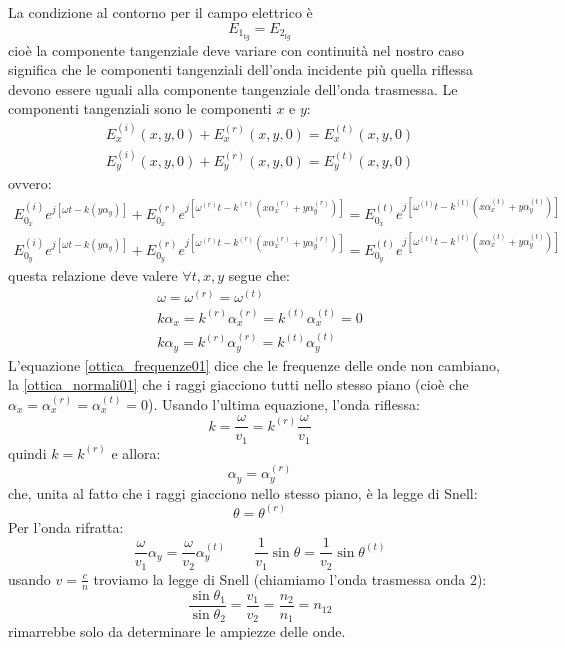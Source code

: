 La condizione al contorno per il campo elettrico è 
\begin{equation}
E_{1_{tg}}=E_{2_{tg}}
\end{equation}
cioè la componente tangenziale deve variare con continuità nel nostro caso significa che le componenti tangenziali dell'onda incidente più quella riflessa devono essere uguali alla componente tangenziale dell'onda trasmessa. Le componenti tangenziali sono le componenti $x$ e $y$:
\begin{subequations}
\begin{gather}
E_x^{(i)}(x,y,0)+E_x^{(r)}(x,y,0)=E_x^{(t)}(x,y,0)\\
E_y^{(i)}(x,y,0)+E_y^{(r)}(x,y,0)=E_y^{(t)}(x,y,0)
\end{gather}
\end{subequations}
ovvero:
\begin{subequations}
\begin{gather}
E^{(i)}_{0_x}e^{j\left[\omega t-k\left(y\alpha_y\right)\right]}+E^{(r)}_{0_x}e^{j\left[\omega^{(r)} t-k^{(r)}(x\alpha_x^{(r)}+y\alpha_y^{(r)})\right]}=E^{(t)}_{0_x}e^{j\left[\omega^{(t)} t-k^{(t)}(x\alpha_x^{(t)}+y\alpha_y^{(t)})\right]}\\
E^{(i)}_{0_y}e^{j\left[\omega t-k\left(y\alpha_y\right)\right]}+E^{(r)}_{0_y}e^{j\left[\omega^{(r)} t-k^{(r)}(x\alpha_x^{(r)}+y\alpha_y^{(r)})\right]}=E^{(t)}_{0_y}e^{j\left[\omega^{(t)} t-k^{(t)}(x\alpha_x^{(t)}+y\alpha_y^{(t)})\right]}
\end{gather}
\label{tante_ottica01}
\end{subequations}
questa relazione deve valere $\forall t,x,y$ segue che:
\begin{subequations}
\begin{gather}
\label{ottica_frequenze01}
\omega=\omega^{(r)}=\omega^{(t)}\\
\label{ottica_normali01}
k\alpha_x=k^{(r)}\alpha_x^{(r)}=k^{(t)}\alpha_x^{(t)}=0\\
k\alpha_y=k^{(r)}\alpha_y^{(r)}=k^{(t)}\alpha_y^{(t)}
\end{gather}
\end{subequations}
L'equazione \eqref{ottica_frequenze01} dice che le frequenze delle onde non cambiano, la \eqref{ottica_normali01} che i raggi giacciono tutti nello stesso piano (cioè che $\alpha_x=\alpha_x^{(r)}=\alpha_x^{(t)}=0$). Usando l'ultima equazione, l'onda riflessa:
\[
k=\frac{\omega}{v_1}=k^{(r)}\frac{\omega}{v_1}
\]
quindi $k=k^{(r)}$ e allora:
\[
\alpha_y = \alpha_y^{(r)}
\]
che, unita al fatto che i raggi giacciono nello stesso piano, è la legge di Snell:
\begin{equation}
\theta=\theta^{(r)}
\end{equation}
Per l'onda rifratta:
\[
\frac{\omega}{v_1}\alpha_y=\frac{\omega}{v_2}\alpha_y^{(t)}
\qquad
\frac{1}{v_1}\sin\theta=\frac{1}{v_2}\sin\theta^{(t)}
\]
usando $v=\frac{c}{n}$ troviamo la legge di Snell (chiamiamo l'onda trasmessa onda $2$):
\begin{equation}
\frac{\sin\theta_1}{\sin\theta_2}=\frac{v_1}{v_2}=\frac{n_2}{n_1}=n_{12}
\end{equation}
rimarrebbe solo da determinare le ampiezze delle onde.



